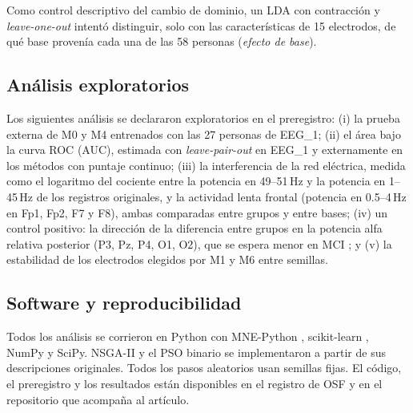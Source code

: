 Como control descriptivo del cambio de dominio, un LDA con contracción y \emph{leave-one-out} intentó distinguir, solo con las características de 15 electrodos, de qué base provenía cada una de las 58 personas (\emph{efecto de base}).

\subsection{Análisis exploratorios}

Los siguientes análisis se declararon exploratorios en el preregistro: (i) la prueba externa de M0 y M4 entrenados con las 27 personas de EEG\_1; (ii) el área bajo la curva ROC (AUC), estimada con \emph{leave-pair-out} en EEG\_1 \citep{airola2011} y externamente en los métodos con puntaje continuo; (iii) la interferencia de la red eléctrica, medida como el logaritmo del cociente entre la potencia en 49--51\,Hz y la potencia en 1--45\,Hz de los registros originales, y la actividad lenta frontal (potencia en 0.5--4\,Hz en Fp1, Fp2, F7 y F8), ambas comparadas entre grupos y entre bases; (iv) un control positivo: la dirección de la diferencia entre grupos en la potencia alfa relativa posterior (P3, Pz, P4, O1, O2), que se espera menor en MCI \citep{babiloni2015}; y (v) la estabilidad de los electrodos elegidos por M1 y M6 entre semillas.

\subsection{Software y reproducibilidad}

Todos los análisis se corrieron en Python con MNE-Python \citep{gramfort2013}, scikit-learn \citep{pedregosa2011}, NumPy y SciPy. NSGA-II y el PSO binario se implementaron a partir de sus descripciones originales. Todos los pasos aleatorios usan semillas fijas. El código, el preregistro y los resultados están disponibles en el registro de OSF y en el repositorio que acompaña al artículo.

